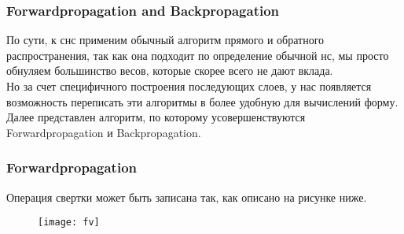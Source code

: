 \documentclass[unicode, notheorems]{beamer}
\begin{document}

	\begin{frame}
\frametitle{Forwardpropagation and Backpropagation}
По сути, к снс применим обычный алгоритм прямого и обратного распространения, так как она подходит по определение обычной нс, мы просто обнуляем большинство весов, которые скорее всего не дают вклада.\\
\vspace{0.3cm}
Но за счет специфичного построения последующих слоев, у нас появляется возможность переписать эти алгоритмы в более удобную для вычислений форму.\\
\vspace{0.3cm}
Далее представлен алгоритм, по которому усовершенствуются Forwardpropagation и Backpropagation.
\end{frame}

	\begin{frame}
		\frametitle{Forwardpropagation}
		Операция свертки может быть записана так, как описано на рисунке ниже.
		\begin{figure}[h]
			\begin{center}
				\begin{minipage}[h]{0.92\linewidth}
					\texttt{[image: fv]}
				\end{minipage}
			\end{center}
		\end{figure}

	\end{frame}
\end{document}
